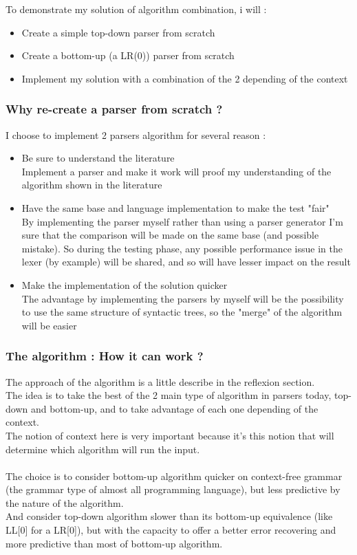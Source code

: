 To demonstrate my solution of algorithm combination, i will :
\begin{itemize}
\item Create a simple top-down parser from scratch
\item Create a bottom-up (a LR(0)) parser from scratch
\item Implement my solution with a combination of the 2 depending of the context
\end{itemize}

\subsubsection{Why re-create a parser from scratch ?}
I choose to implement 2 parsers algorithm for several reason :
\begin{itemize}
\item Be sure to understand the literature\\
Implement a parser and make it work will proof my understanding of the algorithm shown in the literature
\item Have the same base and language implementation to make the test "fair"\\
By implementing the parser myself rather than using a parser generator I'm sure that the comparison will be made on the same base (and possible mistake). So during the testing phase, any possible performance issue in the lexer (by example) will be shared, and so will have lesser impact on the result
\item Make the implementation of the solution quicker\\
The advantage by implementing the parsers by myself will be the possibility to use the same structure of syntactic trees, so the "merge" of the algorithm will be easier
\end{itemize}

\subsubsection{The algorithm : How it can work ?}
The approach of the algorithm is a little describe in the reflexion section.\\
The idea is to take the best of the 2 main type of algorithm in parsers today, top-down and bottom-up, and to take advantage of each one depending of the context.\\
The notion of context here is very important because it's this notion that will determine which algorithm will run the input.\\
\\
The choice is to consider bottom-up algorithm quicker on context-free grammar (the grammar type of almost all programming language), but less predictive by the nature of the algorithm.\\
And consider top-down algorithm slower than its bottom-up equivalence (like LL[0] for a LR[0]), but with the capacity to offer a better error recovering and more predictive than most of bottom-up algorithm.